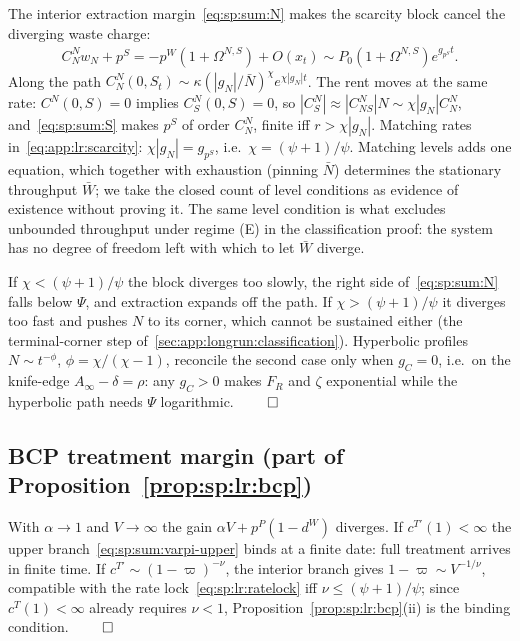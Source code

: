 The interior extraction margin~\eqref{eq:sp:sum:N} makes the scarcity block cancel the
diverging waste charge:
\begin{align}
C^N_Nw_N+p^S=-p^W\left(1+\Omega^{N,S}\right)+O\left(x_t\right)
\sim P_0\left(1+\Omega^{N,S}\right)e^{g_{p^S}t}.
\label{eq:app:lr:scarcity}
\end{align}
Along the path
$C^N_N\left(0,S_t\right)\sim\kappa\left(\left|g_N\right|/\bar N\right)^\chi
e^{\chi\left|g_N\right|t}$. The rent moves at the same rate: $C^N\left(0,S\right)=0$ implies
$C^N_S\left(0,S\right)=0$, so
$\left|C^N_S\right|\approx\left|C^N_{NS}\right|N\sim\chi\left|g_N\right|C^N_N$,
and~\eqref{eq:sp:sum:S} makes $p^S$ of order $C^N_N$, finite iff $r>\chi\left|g_N\right|$.
Matching rates in~\eqref{eq:app:lr:scarcity}: $\chi\left|g_N\right|=g_{p^S}$, i.e.\
$\chi=\left(\psi+1\right)/\psi$. Matching levels adds one equation, which together with
exhaustion (pinning $\bar N$) determines the stationary throughput $\bar W$; we take the closed
count of level conditions as evidence of existence without proving it. The same level condition
is what excludes unbounded throughput under regime (E) in the classification proof: the system
has no degree of freedom left with which to let $\bar W$ diverge.

 If $\chi<\left(\psi+1\right)/\psi$ the block diverges too slowly, the
right side of~\eqref{eq:sp:sum:N} falls below $\Psi$, and extraction expands off the path. If
$\chi>\left(\psi+1\right)/\psi$ it diverges too fast and pushes $N$ to its corner, which cannot
be sustained either (the terminal-corner step of~\ref{sec:app:longrun:classification}).
Hyperbolic profiles $N\sim t^{-\phi}$, $\phi=\chi/\left(\chi-1\right)$, reconcile the second
case only when $g_C=0$, i.e.\ on the knife-edge $A_\infty-\delta=\rho$: any $g_C>0$ makes $F_R$
and $\zeta$ exponential while the hyperbolic path needs $\Psi$ logarithmic. \hfill$\qed$

\subsection{BCP treatment margin (part of Proposition~\ref{prop:sp:lr:bcp})}
\label{sec:app:longrun:treatment}

With $\alpha\to1$ and $V\to\infty$ the gain $\alpha V+p^P\left(1-d^W\right)$ diverges. If
$c^{T\prime}(1)<\infty$ the upper branch~\eqref{eq:sp:sum:varpi-upper} binds at a finite date:
full treatment arrives in finite time. If $c^{T\prime}\sim\left(1-\varpi\right)^{-\nu}$, the
interior branch gives $1-\varpi\sim V^{-1/\nu}$, compatible with the rate
lock~\eqref{eq:sp:lr:ratelock} iff $\nu\le\left(\psi+1\right)/\psi$; since $c^T(1)<\infty$
already requires $\nu<1$, Proposition~\ref{prop:sp:lr:bcp}(ii) is the binding condition.
\hfill$\qed$

